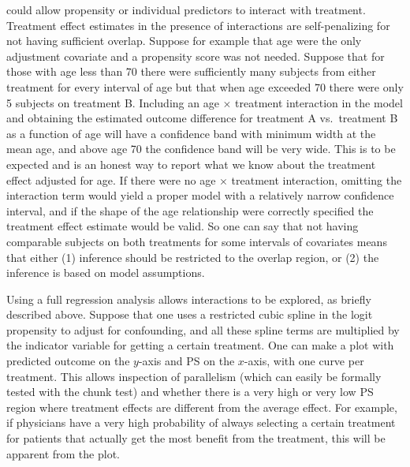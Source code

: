   could allow
  propensity or individual predictors to interact with treatment.
  Treatment effect estimates in the presence of interactions are
  self-penalizing for not having sufficient overlap.  Suppose for
  example that age were the only adjustment covariate and a propensity
  score was not needed.  Suppose that for those with age less than 70
  there were sufficiently many subjects from either treatment for
  every interval of age but that when age exceeded 70 there were only
  5 subjects on treatment B.  Including an age $\times$ treatment
  interaction in the model and obtaining the estimated outcome difference 
  for treatment A vs.\ treatment B as a function of age will have
  a confidence band with minimum width at the mean age, and
  above age 70 the confidence band will be very wide.  This is to be
  expected and is an honest way to report what we know about the
  treatment effect adjusted for age.   If there were no age $\times$
  treatment interaction, omitting the interaction term would yield a
  proper model with a relatively narrow confidence interval, and if
  the shape of the age relationship were correctly specified the
  treatment effect estimate would be valid.  So one can say that not
  having comparable subjects on both treatments for some intervals of
  covariates means that either (1) inference should be restricted to
  the overlap region, or (2) the inference is based on model assumptions.
  \ee

Using a full regression analysis allows interactions to be explored,
as briefly described above.
Suppose that one uses a restricted cubic spline in the logit
propensity to adjust for confounding, and all these spline terms are
multiplied by the indicator variable for getting a certain treatment.
One can make a plot with predicted outcome on the $y$-axis and PS on
the $x$-axis, with one curve per treatment.  This allows inspection of
parallelism (which can easily be formally tested with the chunk test)
and whether there is a very high or very low PS region where treatment
effects are different from the average effect.  For example, if
physicians have a very high probability of always selecting a certain
treatment for patients that actually get the most benefit from the
treatment, this will be apparent from the plot.

